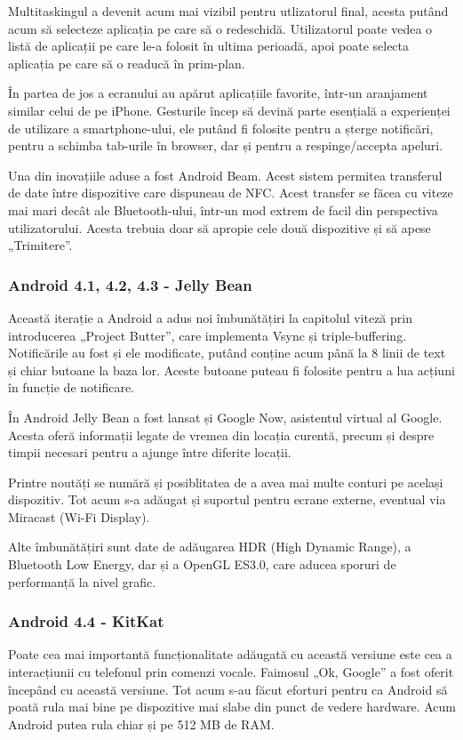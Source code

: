 \documentclass[12pt,a4paper]{article}
\begin{document}
	Multitaskingul a devenit acum mai vizibil pentru utlizatorul final, acesta putând acum să selecteze aplicația pe care să o redeschidă. Utilizatorul poate vedea o listă de aplicații pe care le-a folosit în ultima perioadă, apoi poate selecta aplicația pe care să o readucă în prim-plan.

	În partea de jos a ecranului au apărut aplicațiile favorite, într-un aranjament similar celui de pe iPhone. Gesturile încep să devină parte esențială a experienței de utilizare a smartphone-ului, ele putând fi folosite pentru a șterge notificări, pentru a schimba tab-urile în browser, dar și pentru a respinge/accepta apeluri.

	Una din inovațiile aduse a fost Android Beam. Acest sistem permitea transferul de date între dispozitive care dispuneau de NFC. Acest transfer se făcea cu viteze mai mari decât ale Bluetooth-ului, într-un mod extrem de facil din perspectiva utilizatorului. Acesta trebuia doar să apropie cele două dispozitive și să apese „Trimitere”.


\subsubsection{Android 4.1, 4.2, 4.3 - Jelly Bean}
Această iterație a Android a adus noi îmbunătățiri la capitolul viteză prin introducerea „Project Butter”, care implementa Vsync și triple-buffering. Notificările au fost și ele modificate, putând conține acum până la 8 linii de text și chiar butoane la baza lor. Aceste butoane puteau fi folosite pentru a lua acțiuni în funcție de notificare.

	În Android Jelly Bean a fost lansat și Google Now, asistentul virtual al Google. Acesta oferă informații legate de vremea din locația curentă, precum și despre timpii necesari pentru a ajunge între diferite locații.

	Printre noutăți se numără și posiblitatea de a avea mai multe conturi pe același dispozitiv. Tot acum s-a adăugat și suportul pentru ecrane externe, eventual via Miracast (Wi-Fi Display).

	Alte îmbunătățiri sunt date de adăugarea HDR (High Dynamic Range), a Bluetooth Low Energy, dar și a OpenGL ES3.0, care aducea sporuri de performanță la nivel grafic.


\subsubsection{Android 4.4 - KitKat}
Poate cea mai importantă funcționalitate adăugată cu această versiune este cea a interacțiunii cu telefonul prin comenzi vocale. Faimosul „Ok, Google” a fost oferit începând cu această versiune. Tot acum s-au făcut eforturi pentru ca Android să poată rula mai bine pe dispozitive mai slabe din punct de vedere hardware. Acum Android putea rula chiar și pe 512 MB de RAM.
\end{document}
